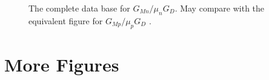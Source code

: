 \begin{figure}
\begin{center}
\caption{The complete data base for $G_{Mn}/\mu_nG_D$. May compare with the equivalent figure for $G_{Mp}/\mu_pG_D$ .}
\label{fig:gmn}
\end{center}
\end{figure}

\section{More Figures}

